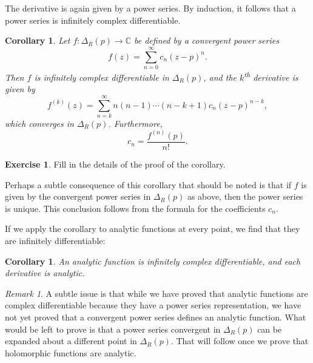 \documentclass[12pt,openany]{book}
\newcommand{\C}{{\mathbb{C}}}
\theoremstyle{plain}
\newtheorem{cor}[thm]{Corollary}
\theoremstyle{remark}
\newtheorem{remark}[thm]{Remark}
\theoremstyle{definition}
\newenvironment{exbox}{%
    \def\FrameCommand{\vrule width 1pt \relax\hspace{10pt}}%
    \MakeFramed{\advance\hsize-\width\FrameRestore}%
}{%
    \endMakeFramed
}
\theoremstyle{exercise}
\newtheorem{exercise}{Exercise}[section]
\theoremstyle{example}
\begin{document}
The derivative is again given by a power series.
By induction, it follows that a power series is infinitely complex
differentiable.

\begin{cor} \label{cor:convpowserinfdif}
Let $f \colon \Delta_R(p) \to \C$ be defined by a convergent power series
\begin{equation*}
f(z) = \sum_{n=0}^\infty c_n {(z-p)}^n .
\end{equation*}
Then $f$ is infinitely complex differentiable in $\Delta_R(p)$,
and the $k$\textsuperscript{th} derivative is given by
\begin{equation*}
f^{(k)}(z) = \sum_{n=k}^\infty n(n-1)\cdots(n-k+1) c_n {(z-p)}^{n-k} ,
\end{equation*}
which converges in $\Delta_R(p)$.
Furthermore,
\begin{equation*}
c_n =
\frac{f^{(n)}(p)}{n!} .
\end{equation*}
\end{cor}

\begin{exbox}
\begin{exercise}
Fill in the details of the proof of the corollary.
\end{exercise}
\end{exbox}

Perhaps a subtle consequence of
this corollary that should be
noted is that if $f$ is given by the convergent power series in
$\Delta_R(p)$ as above, then the power series is unique.  This conclusion
follows from the formula for the coefficients $c_n$.

If we apply the corollary to analytic functions at every point,
we find that they are infinitely differentiable:

\begin{cor} \label{cor:analinfdif}
An analytic function is infinitely complex differentiable, and each
derivative is analytic.
\end{cor}

\begin{remark}
A subtle issue is that while we have proved that analytic functions are
complex differentiable because they have a power series representation,
we have not yet proved that a convergent power series defines an analytic
function.  What would be left to prove is that a power series convergent
in $\Delta_R(p)$ can be
expanded about a different point in $\Delta_R(p)$.  That will follow
once we prove that holomorphic functions are analytic.
\end{remark}
\end{document}
